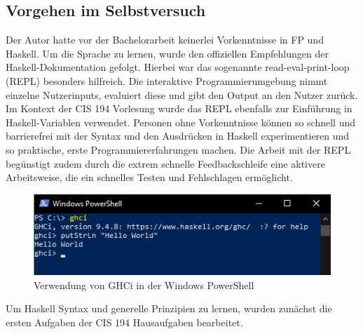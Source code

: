 \subsection{Vorgehen im Selbstversuch}\label{sec:tools_prac}
Der Autor hatte vor der Bachelorarbeit keinerlei Vorkenntnisse in FP und Haskell. Um die Sprache zu lernen, wurde den offiziellen Empfehlungen der Haskell-Dokumentation gefolgt. Hierbei war das sogenannte read-eval-print-loop (REPL) besonders hilfreich. Die interaktive Programmierumgebung nimmt einzelne Nutzerinputs, evaluiert diese und gibt den Output an den Nutzer zurück. Im Kontext der CIS 194 Vorlesung wurde das REPL ebenfalls zur Einführung in Haskell-Variablen verwendet.
Personen ohne Vorkenntnisse können so schnell und barrierefrei mit der Syntax und den Ausdrücken in Haskell experimentieren und so praktische, erste Programmiererfahrungen machen.
Die Arbeit mit der REPL begünstigt zudem durch die extrem schnelle Feedbackschleife eine aktivere Arbeitsweise, die ein schnelles Testen und Fehlschlagen ermöglicht.

\begin{figure}[H]
    \centering
    \includegraphics[width=1\linewidth]{Figures/Anhang/ghci}
    \caption{Verwendung von GHCi in der Windows PowerShell}
\end{figure}

Um Haskell Syntax und generelle Prinzipien zu lernen, wurden zunächst die ersten Aufgaben der CIS 194 Hausaufgaben bearbeitet.